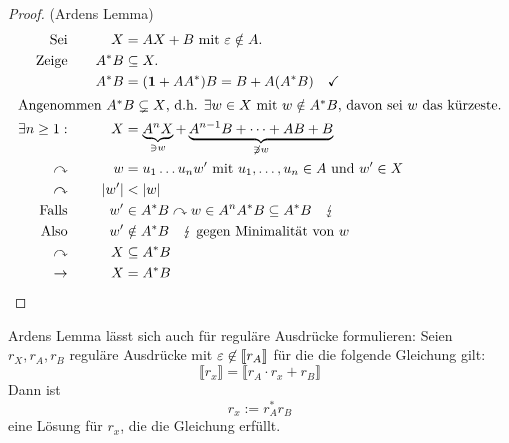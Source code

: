 \begin{proof}(Ardens Lemma)
	\begin{alignat*}{3}
		\text{Sei}&\quad& X&= AX+B\text{ mit }\Eps\notin A.\\
		\text{Zeige}&& A^*B&\subseteq X.\\
		&& A^*B &= (\1+AA^*)B = B+A(A^*B) \quad\checkmark\\
		\shortintertext{Angenommen $A^*B \subsetneq X$, d.h. $\exists w\in X$ mit $w\notin A^*B$, davon sei $w$ das kürzeste.}
		\exists n\geq 1: && X &= \underbrace{A^nX}_{\ni w} + \underbrace{A^{n-1}B+\dots +AB+B}_{\not\ni w}\\
		\curvearrowright && w &= u_1\dots u_n w'\text{ mit } u_1,\dots,u_n\in A\text{ und } w'\in X\\
		\curvearrowright && |w'| &< |w|\\
		\text{Falls}&& w'&\in A^*B \curvearrowright w\in A^nA^*B\subseteq A^*B \quad \lightning\\
		\text{Also} && w'&\notin A^*B \quad\lightning\text{ gegen Minimalität von }w\\
		\curvearrowright && X&\subseteq A^*B\\
		\-> && X &= A^*B \tag*{\qedhere}
	\end{alignat*}
\end{proof}

\begin{Korollar}
  Ardens Lemma lässt sich auch für reguläre Ausdrücke formulieren: Seien $r_X,r_A,r_B$ reguläre Ausdrücke mit $\varepsilon \not \in \llbracket r_A \rrbracket$ für die die folgende Gleichung gilt:
  \begin{displaymath}
    \llbracket r_x \rrbracket = \llbracket r_A \cdot r_x + r_B \rrbracket
  \end{displaymath}
  Dann ist 
  \begin{displaymath}
    r_x := r_A^*r_B
  \end{displaymath}
  eine Lösung für $r_x$, die die Gleichung erfüllt.
\end{Korollar}


